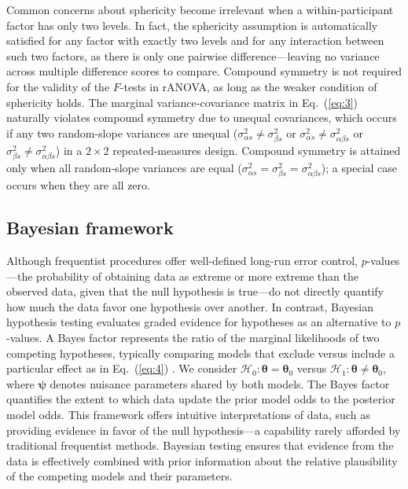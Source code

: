 \documentclass[preprint,12pt,authoryear]{elsarticle}
\begin{document}
Common concerns about sphericity become irrelevant when a within-participant factor has only two levels. In fact, the sphericity assumption is automatically satisfied for any factor with exactly two levels and for any interaction between such two factors, as there is only one pairwise difference—leaving no variance across multiple difference scores to compare. Compound symmetry is not required for the validity of the $F$-tests in rANOVA, as long as the weaker condition of sphericity holds. The marginal variance-covariance matrix in Eq.~(\ref{eq:3}) naturally violates compound symmetry due to unequal covariances, which occurs if any two random-slope variances are unequal ($\sigma_{\alpha s}^2\neq\sigma_{\beta s}^2$ or $\sigma_{\alpha s}^2\neq\sigma_{\alpha\beta s}^2$ or $\sigma_{\beta s}^2\neq\sigma_{\alpha\beta s}^2$) in a $2\times2$ repeated-measures design. Compound symmetry is attained only when all random-slope variances are equal ($\sigma_{\alpha s}^2=\sigma_{\beta s}^2=\sigma_{\alpha\beta s}^2$); a special case occurs when they are all zero.


\subsection{Bayesian framework}
\label{sec2.2}

Although frequentist procedures offer well-defined long-run error control, $p$-values—the probability of obtaining data as extreme or more extreme than the observed data, given that the null hypothesis is true—do not directly quantify how much the data favor one hypothesis over another. In contrast, Bayesian hypothesis testing evaluates graded evidence for hypotheses as an alternative to $p$-values. A Bayes factor represents the ratio of the marginal likelihoods of two competing hypotheses, typically comparing models that exclude versus include a particular effect as in Eq.~(\ref{eq:4}) \citep{kass_bayes_1995}. We consider $\mathcal{H}_0: \boldsymbol{\theta}=\boldsymbol{\theta}_0$ versus $\mathcal{H}_1: \boldsymbol{\theta}\neq\boldsymbol{\theta}_0$, where $\boldsymbol{\psi}$ denotes nuisance parameters shared by both models. The Bayes factor quantifies the extent to which data update the prior model odds to the posterior model odds. This framework offers intuitive interpretations of data, such as providing evidence in favor of the null hypothesis—a capability rarely afforded by traditional frequentist methods. Bayesian testing ensures that evidence from the data is effectively combined with prior information about the relative plausibility of the competing models and their parameters.
\end{document}
